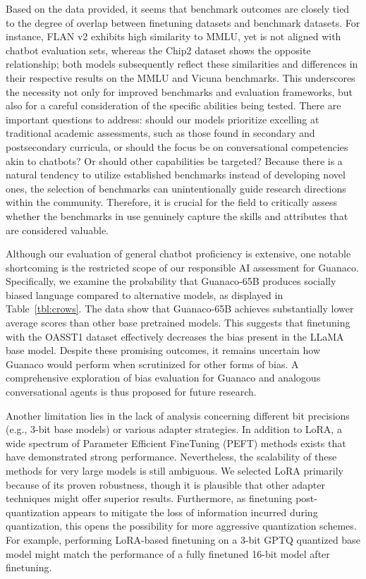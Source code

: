 Based on the data provided, it seems that benchmark outcomes are closely tied to the degree of overlap between finetuning datasets and benchmark datasets. For instance, FLAN v2 exhibits high similarity to MMLU, yet is not aligned with chatbot evaluation sets, whereas the Chip2 dataset shows the opposite relationship; both models subsequently reflect these similarities and differences in their respective results on the MMLU and Vicuna benchmarks. This underscores the necessity not only for improved benchmarks and evaluation frameworks, but also for a careful consideration of the specific abilities being tested. There are important questions to address: should our models prioritize excelling at traditional academic assessments, such as those found in secondary and postsecondary curricula, or should the focus be on conversational competencies akin to chatbots? Or should other capabilities be targeted? Because there is a natural tendency to utilize established benchmarks instead of developing novel ones, the selection of benchmarks can unintentionally guide research directions within the community. Therefore, it is crucial for the field to critically assess whether the benchmarks in use genuinely capture the skills and attributes that are considered valuable.

Although our evaluation of general chatbot proficiency is extensive, one notable shortcoming is the restricted scope of our responsible AI assessment for {Guanaco}. Specifically, we examine the probability that {Guanaco}-65B produces socially biased language compared to alternative models, as displayed in Table~\ref{tbl:crows}. The data show that {Guanaco}-65B achieves substantially lower average scores than other base pretrained models. This suggests that finetuning with the OASST1 dataset effectively decreases the bias present in the LLaMA base model. Despite these promising outcomes, it remains uncertain how {Guanaco} would perform when scrutinized for other forms of bias. A comprehensive exploration of bias evaluation for {Guanaco} and analogous conversational agents is thus proposed for future research.

Another limitation lies in the lack of analysis concerning different bit precisions (e.g., 3-bit base models) or various adapter strategies. In addition to LoRA, a wide spectrum of Parameter Efficient FineTuning (PEFT) methods exists that have demonstrated strong performance. Nevertheless, the scalability of these methods for very large models is still ambiguous. We selected LoRA primarily because of its proven robustness, though it is plausible that other adapter techniques might offer superior results. Furthermore, as finetuning post-quantization appears to mitigate the loss of information incurred during quantization, this opens the possibility for more aggressive quantization schemes. For example, performing LoRA-based finetuning on a 3-bit GPTQ quantized base model might match the performance of a fully finetuned 16-bit model after finetuning.


